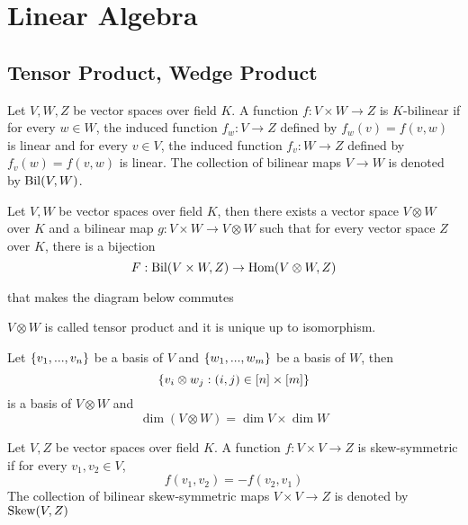 \section{Linear Algebra}

\subsection{Tensor Product, Wedge Product}

\begin{definition}
	Let $V, W, Z$ be vector spaces over field $K$. A function $f: V \times W \to Z$ is $K$-bilinear if for every $w \in W$, the induced function $f_w: V \to Z$ defined by $f_w(v) = f(v, w)$ is linear and for every $v \in V$, the induced function $f_v: W \to Z$ defined by $f_v(w) = f(v, w)$ is linear. The collection of bilinear maps $V \to W$ is denoted by $\operatorname{Bil}(V, W)$.
\end{definition}

\begin{proposition}
	Let $V, W$ be vector spaces over field $K$, then there exists a vector space $V \otimes W$ over $K$ and a bilinear map $g: V \times W \to V \otimes W$ such that for every vector space $Z$ over $K$, there is a bijection 
	$$
	F: \operatorname{Bil}(V \times W, Z) \to \operatorname{Hom}(V \otimes W, Z)
	$$
	
	that makes the diagram below commutes
	
	\begin{center}
	\end{center}
	
	$V \otimes W$ is called tensor product and it is unique up to isomorphism.
\end{proposition}

\begin{remark}
	Let $\{v_1, ..., v_n\}$ be a basis of $V$ and $\{w_1, ..., w_m\}$ be a basis of $W$, then
	$$
	\{v_i \otimes w_j: (i, j) \in [n] \times [m]\}
	$$
	is a basis of $V \otimes W$ and
	$$
	\dim (V \otimes W) = \dim V \times \dim W
	$$
\end{remark}

\begin{definition}
	Let $V, Z$ be vector spaces over field $K$. A function $f: V \times V \to Z$ is skew-symmetric if for every $v_1, v_2 \in V$,
	$$
		f(v_1, v_2) = - f(v_2, v_1)
	$$
	The collection of bilinear skew-symmetric maps $V \times V \to Z$ is denoted by $\operatorname{Skew}(V, Z)$
\end{definition}

